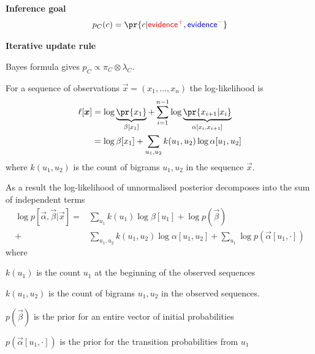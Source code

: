 \documentclass[landscape,footrule]{foils}
\newcommand{\EVPOS}{\textcolor{red}{\mathsf{evidence}^+}}
\newcommand{\EVNEG}{\textcolor{blue}{\mathsf{evidence}^-}}
\begin{document}

\vspace*{-0.0cm}
\textbf{Inference goal}
\begin{align*}
p_C(c)=\pr{c|\EVPOS,\EVNEG}
\end{align*}\vspace*{-1.5cm}


\textbf{Iterative update rule}
\begin{triangles}
\item Bayes formula gives $p_C\propto \pi_C\otimes\lambda_C$.
\end{triangles}






For a sequence of observations $\vec{x}=(x_1,\ldots, x_{n})$ the log-likelihood is
\begin{align*}
\ell[\vec{x}]&=\log \underbrace{\pr{x_1}}_{\beta[x_1]} + \sum_{i=1}^{n-1} \log \underbrace{\pr{x_{i+1}|x_{i}}}_{\alpha[x_i, x_{i+1}]} \\
&=\log \beta[x_1] + \sum_{u_1,u_2} k(u_1,u_2)\log\alpha[u_1,u_2]
\end{align*}
where $k(u_1,u_2)$ is the count of bigrams $u_1, u_2$ in the sequence $\vec{x}$.


\enlargethispage{0.5cm}
As a result the log-likelihood of unnormalised posterior decomposes into the sum of independent terms
\begin{align*}
\log p[\vec{\alpha},\vec{\beta}|\vec{x}]
=&\sum_{u_1} k(u_1)\log \beta[u_1] + \log p(\vec{\beta})\\
+&\sum_{u_1,u_2} k(u_1,u_2)\log\alpha[u_1,u_2]+\sum_{u_1}\log p(\vec{\alpha}[u_1,\cdot]) 
\end{align*}
where 
\begin{triangles}
\item $k(u_1)$ is the count $u_1$ at the beginning of the observed sequences
\item $k(u_1,u_2)$ is the count of bigrams $u_1, u_2$ in the observed sequences.
\item $p(\vec{\beta})$ is the prior for an entire vector of initial probabilities
\item $p(\vec{\alpha}[u_1,\cdot])$ is the prior for the transition probabilities from $u_1$ 
\end{triangles}
\end{document}
